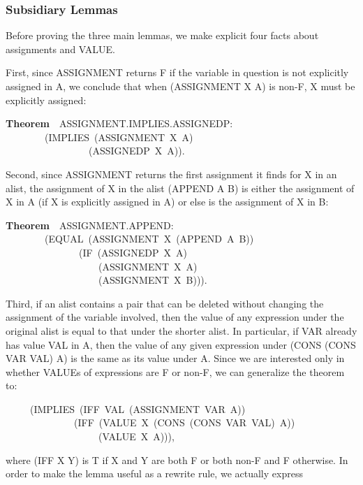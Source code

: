 \documentclass[10pt]{book}
\newenvironment{pubasis}{\begin{flushleft}}{\end{flushleft}}
\newcommand{\axiomordefinition}[1]{\vspace{6pt}\Large\textsf{\textbf{#1}}\normalsize}
\begin{document}
\subsubsection{Subsidiary Lemmas}
Before proving the three main lemmas, we make explicit four facts
about assignments and VALUE.

First, since ASSIGNMENT returns F if the variable in question is not explicitly
assigned in A, we conclude that when (ASSIGNMENT X A) is non-F,
X must be explicitly assigned:
\begin{pubasis}
\axiomordefinition{Theorem}~~ASSIGNMENT.IMPLIES.ASSIGNEDP:\\
~~~~~~~~(IMPLIES~(ASSIGNMENT~X~A)\\
~~~~~~~~~~~~~~~~~(ASSIGNEDP~X~A)).\\
\end{pubasis}
Second, since ASSIGNMENT returns the first assignment it finds for
X in an alist, the assignment of X in the alist (APPEND A B) is either the
assignment of X in A (if X is explicitly assigned in A) or
else is the assignment of X in B:
\begin{pubasis}
\axiomordefinition{Theorem}~~ASSIGNMENT.APPEND:\\
~~~~~~~~(EQUAL~(ASSIGNMENT~X~(APPEND~A~B))\\
~~~~~~~~~~~~~~~(IF~(ASSIGNEDP~X~A)\\
~~~~~~~~~~~~~~~~~~~(ASSIGNMENT~X~A)\\
~~~~~~~~~~~~~~~~~~~(ASSIGNMENT~X~B))).\\
\end{pubasis}
Third, if an alist contains a pair that can be deleted without changing
the assignment of the variable involved, then the value of any
expression under the original alist is equal to that under the shorter
alist.  In particular, if VAR already has value VAL in A, then
the value of any given expression under (CONS (CONS VAR VAL) A) is the same as its value
under A.
Since we are  interested only in whether VALUEs of expressions
are F or non-F, we can generalize the theorem to:
\begin{pubasis}
~~~~~(IMPLIES~(IFF~VAL~(ASSIGNMENT~VAR~A))\\
~~~~~~~~~~~~~~(IFF~(VALUE~X~(CONS~(CONS~VAR~VAL)~A))\\
~~~~~~~~~~~~~~~~~~~(VALUE~X~A))),\\
\end{pubasis}
where (IFF X Y) is T if X and Y are both F or both non-F and F otherwise.
In order to make the lemma useful as a rewrite rule, we actually express
\end{document}
